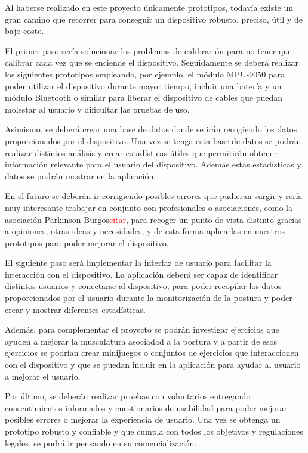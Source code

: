 

Al haberse realizado en este proyecto únicamente prototipos, todavía existe un gran camino que recorrer para conseguir un dispositivo robusto, preciso, útil y de bajo coste. 

El primer paso sería solucionar los problemas de calibración para no tener que calibrar cada vez que se enciende el dispositivo. Seguidamente se deberá realizar los siguientes prototipos empleando, por ejemplo, el módulo MPU-9050 para poder utilizar el dispositivo durante mayor tiempo, incluir una batería y un módulo Bluetooth o similar para liberar el dispositivo de cables que puedan molestar al usuario y dificultar las pruebas de uso.

Asimismo, se deberá crear una base de datos donde se irán recogiendo los datos proporcionados por el dispositivo. Una vez se tenga esta base de datos se podrán realizar distintos análisis y crear estadísticas útiles que permitirán obtener información relevante para el usuario del dispositivo. Además estas estadísticas y datos se podrán mostrar en la aplicación.

En el futuro se deberán ir corrigiendo posibles errores que pudieran surgir y sería muy interesante trabajar en conjunto con profesionales o asociaciones, como la asociación Parkinson Burgos\textcolor{red}{citar}, para recoger un punto de vista distinto gracias a opiniones, otras ideas y necesidades, y de esta forma aplicarlas en nuestros prototipos para poder mejorar el dispositivo.

El siguiente paso será implementar la interfaz de usuario para facilitar la interacción con el dispositivo. La aplicación deberá ser capaz de identificar distintos usuarios y conectarse al dispositivo, para poder recopilar los datos proporcionados por el usuario durante la monitorización de la postura y poder crear y mostrar diferentes estadísticas. 

Además, para complementar el proyecto se podrán investigar ejercicios que ayuden a mejorar la musculatura asociadad a la postura y a partir de esos ejercicios se podrían crear minijuegos o conjuntos de ejercicios que interaccionen con el dispositivo y que se puedan incluir en la aplicación para ayudar al usuario a mejorar el usuario.

Por último, se deberán realizar pruebas con voluntarios entregando consentimientos informados y cuestionarios de usabilidad para poder mejorar posibles errores o mejorar la experiencia de usuario. Una vez se obtenga un prototipo robusto y confiable y que cumpla con todos los objetivos y regulaciones legales, se podrá ir pensando en su comercialización. 

